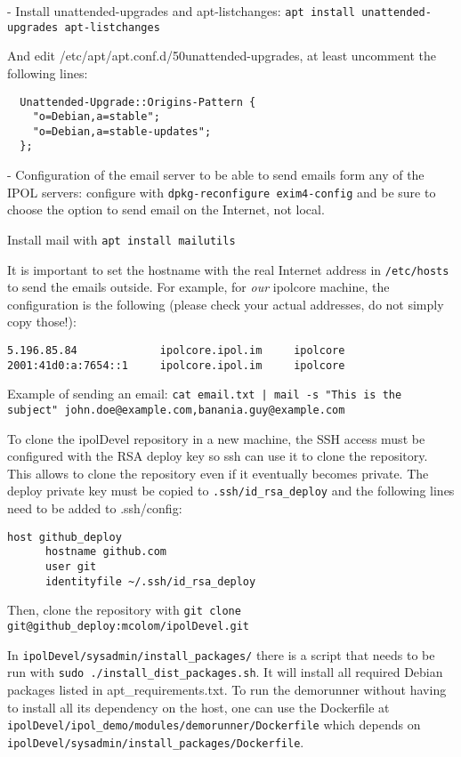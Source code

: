 \documentclass[a4paper,12pt]{article}
\begin{document}
- Install unattended-upgrades and apt-listchanges: {\tt apt install unattended-upgrades apt-listchanges}

And edit /etc/apt/apt.conf.d/50unattended-upgrades, at least uncomment the following lines:
\begin{verbatim}
  Unattended-Upgrade::Origins-Pattern {
    "o=Debian,a=stable";
    "o=Debian,a=stable-updates";
  };
\end{verbatim}

- Configuration of the email server to be able to send emails form any of the IPOL servers: configure with {\tt dpkg-reconfigure exim4-config} and be sure to choose the option to send email on the Internet, not local.

Install mail with {\tt apt install mailutils}

It is important to set the hostname with the real Internet address in {\tt /etc/hosts} to send the emails outside. For example, for \emph{our} ipolcore machine, the configuration is the following (please check your actual addresses, do not simply copy those!):

\begin{verbatim}
5.196.85.84             ipolcore.ipol.im     ipolcore
2001:41d0:a:7654::1     ipolcore.ipol.im     ipolcore
\end{verbatim}

Example of sending an email: {\tt cat email.txt | mail -s "This is the subject" john.doe@example.com,banania.guy@example.com}

To clone the ipolDevel repository in a new machine, the SSH access must be configured with the RSA deploy key so ssh can use it to clone the repository. This allows to clone the repository even if it eventually becomes private.
%
The deploy private key must be copied to {\tt .ssh/id\_rsa\_deploy} and the following lines need to be added to .ssh/config:

\begin{verbatim}
host github_deploy
      hostname github.com
      user git
      identityfile ~/.ssh/id_rsa_deploy
\end{verbatim}

Then, clone the repository with {\tt git clone git@github\_deploy:mcolom/ipolDevel.git}

In {\tt ipolDevel/sysadmin/install\_packages/} there is a script that needs to be run with {\tt sudo ./install\_dist\_packages.sh}. It will install all required Debian packages listed in apt\_requirements.txt.
To run the demorunner without having to install all its dependency on the host, one can use the Dockerfile at {\tt ipolDevel/ipol\_demo/modules/demorunner/Dockerfile} which depends on {\tt ipolDevel/sysadmin/install\_packages/Dockerfile}.
\end{document}
